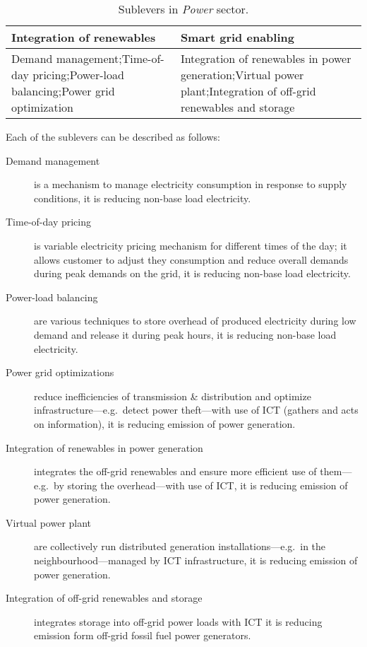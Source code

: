 \documentclass[11pt, twocolumn]{article}
\begin{document}
\begin{center}
  \begin{table}[h]
    \begin{tabular}{ p{} | p{} }%
      Integration of renewables & Smart grid enabling \\
      \hline
      Demand management;\newline Time-of-day pricing;\newline Power-load balancing;\newline Power grid optimization & Integration of renewables in power generation;\newline Virtual power plant;\newline Integration of off-grid renewables and storage
    \end{tabular}
    \caption{Sublevers in \emph{Power} sector.\label{tab:powersublevers}}
  \end{table}
\end{center}

Each of the sublevers can be described as follows:
\begin{description}
\item[Demand management] is a mechanism to manage electricity consumption in response to supply conditions, it is reducing non-base load electricity.

\item[Time-of-day pricing] is variable electricity pricing mechanism for different times of the day; it allows customer to adjust they consumption and reduce overall demands during peak demands on the grid, it is reducing non-base load electricity.

\item[Power-load balancing] are various techniques to store overhead of produced electricity during low demand and release it during peak hours, it is reducing non-base load electricity.

\item[Power grid optimizations] reduce inefficiencies of transmission \& distribution and optimize infrastructure---e.g.\ detect power theft---with use of ICT (gathers and acts on information), it is reducing emission of power generation.

\item[Integration of renewables in power generation] integrates the off-grid renewables and ensure more efficient use of them---e.g.\ by storing the overhead---with use of ICT, it is reducing emission of power generation.

\item[Virtual power plant] are collectively run distributed generation installations---e.g.\ in the neighbourhood---managed by ICT infrastructure, it is reducing emission of power generation.

\item[Integration of off-grid renewables and storage] integrates storage into off-grid power loads with ICT it is reducing emission form off-grid fossil fuel power generators.
\end{description}
\end{document}
